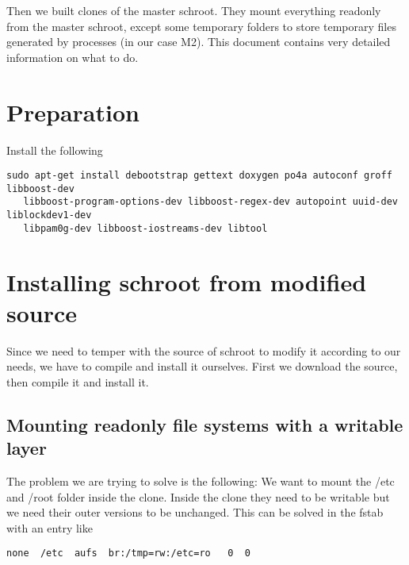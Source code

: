 \documentclass[a4paper]{book}
\begin{document}
Then we built clones of the master schroot. They mount everything readonly from
the master schroot, except some temporary folders to store temporary files
generated by processes (in our case M2). This document contains very detailed
information on what to do.

\section{Preparation}

Install the following

\begin{verbatim}
sudo apt-get install debootstrap gettext doxygen po4a autoconf groff libboost-dev
   libboost-program-options-dev libboost-regex-dev autopoint uuid-dev liblockdev1-dev
   libpam0g-dev libboost-iostreams-dev libtool
\end{verbatim}


\section{Installing schroot from modified source}
Since we need to temper with the source of schroot to modify it according to our needs, we have to compile and install it ourselves. First we download the source, then compile it and install it.

\subsection{Mounting readonly file systems with a writable layer}
The problem we are trying to solve is the following: We want to mount the /etc
and /root folder inside the clone. Inside the clone they need to be writable
but we need their outer versions to be unchanged.  This can be solved in the
fstab with an entry like

\begin{verbatim}
none  /etc  aufs  br:/tmp=rw:/etc=ro   0  0
\end{verbatim}
\end{document}

